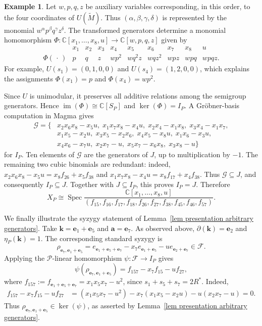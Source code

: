 \documentclass[11pt]{amsart}
\numberwithin{equation}{section}
\theoremstyle{plain}
\theoremstyle{definition}
\newtheorem{example}[theorem]{Example}
\newcommand{\0}{$0$-mutable}
\newcommand{\CC}{\ensuremath{\mathbb{C}}}
\newcommand{\bfa}{\ensuremath{\mathbf{a}}}
\newcommand{\bfk}{\ensuremath{\mathbf{k}}}
\renewcommand{\1}{$1$-rigid}
\renewcommand{\0}{$0$-mutable}
\begin{document}
{\begin{example}
Let \(w,p,q,z\) be auxiliary variables corresponding, in this order,
to the four coordinates of \(U(\widetilde M)\). Thus
\((\alpha,\beta,\gamma,\delta)\) is represented by the monomial
\(w^\alpha p^\beta q^\gamma z^\delta\). The transformed generators
determine a monomial homomorphism
\(\Phi\colon\CC[x_1,\ldots,x_8,u]\to\CC[w,p,q,z]\) given by
\[
\begin{array}{c|ccccccccc}
 &x_1&x_2&x_3&x_4&x_5&x_6&x_7&x_8&u\\ \hline
\Phi(\,\cdot\,)
&p&q&z&wp^2&wq^2z&wqz^2&wpz&wpq&wpqz.
\end{array}
\]
For example, \(U(s_1)=(0,1,0,0)\) and
\(U(s_4)=(1,2,0,0)\), which explains the assignments
\(\Phi(x_1)=p\) and \(\Phi(x_4)=wp^2\).

Since \(U\) is unimodular, it preserves all additive relations among
the semigroup generators. Hence
\(\operatorname{im}(\Phi)\cong\CC[S_P]\) and
\(\ker(\Phi)=I_P\). A Gr\"obner-basis computation in Magma gives
\[
\begin{aligned}
\mathcal G=\bigl\{&
x_2x_6x_8-x_5u,\;
x_1x_7x_8-x_4u,\;
x_2x_4-x_1x_8,\;
x_3x_4-x_1x_7,\\
&
x_1x_5-x_2u,\;
x_3x_5-x_2x_6,\;
x_4x_5-x_8u,\;
x_1x_6-x_3u,\\
&
x_4x_6-x_7u,\;
x_2x_7-u,\;
x_5x_7-x_6x_8,\;
x_3x_8-u
\bigr\}
\end{aligned}
\]
for \(I_P\). Ten elements of \(\mathcal G\) are the generators of
\(J\), up to multiplication by \(-1\). The remaining two cubic
binomials are redundant: indeed,
\(x_2x_6x_8-x_5u=x_8f_{26}+x_5f_{38}\) and
\(x_1x_7x_8-x_4u=x_8f_{17}+x_4f_{38}\). Thus
\(\mathcal G\subseteq J\), and consequently \(I_P\subseteq J\).
Together with \(J\subseteq I_P\), this proves \(I_P=J\). Therefore
\[
X_P\cong
\operatorname{Spec}
\frac{\CC[x_1,\ldots,x_8,u]}
{(f_{15},f_{16},f_{17},f_{18},f_{26},
  f_{27},f_{38},f_{45},f_{46},f_{57})}.
\]

We finally illustrate the syzygy statement of
Lemma~\ref{lem presentation arbitrary generators}. Take
\(\bfk=\mathbf e_1+\mathbf e_5\) and \(\bfa=\mathbf e_7\). As observed
above, \(\partial(\bfk)=\mathbf e_2\) and \(\eta_P(\bfk)=1\). The
corresponding standard syzygy is
\[
\rho_{\mathbf e_7,\mathbf e_1+\mathbf e_5}
=
e_{\mathbf e_1+\mathbf e_5+\mathbf e_7}
-x_7e_{\mathbf e_1+\mathbf e_5}
-u e_{\mathbf e_2+\mathbf e_7}
\in\mathcal F.
\]
Applying the \(\mathcal P\)-linear homomorphism
\(\psi\colon\mathcal F\to I_P\) gives
\[
\psi\left(
\rho_{\mathbf e_7,\mathbf e_1+\mathbf e_5}
\right)
=
f_{157}-x_7f_{15}-uf_{27},
\]
where
\(f_{157}:=f_{\mathbf e_1+\mathbf e_5+\mathbf e_7}
=x_1x_5x_7-u^2\), since \(s_1+s_5+s_7=2R^*\). Indeed,
\[
\begin{aligned}
f_{157}-x_7f_{15}-uf_{27}
&=(x_1x_5x_7-u^2)
-x_7(x_1x_5-x_2u)
-u(x_2x_7-u)
=0.
\end{aligned}
\]
Thus
\(\rho_{\mathbf e_7,\mathbf e_1+\mathbf e_5}\in\ker(\psi)\), as
asserted by Lemma~\ref{lem presentation arbitrary generators}.
\end{example}
}
\end{document}
